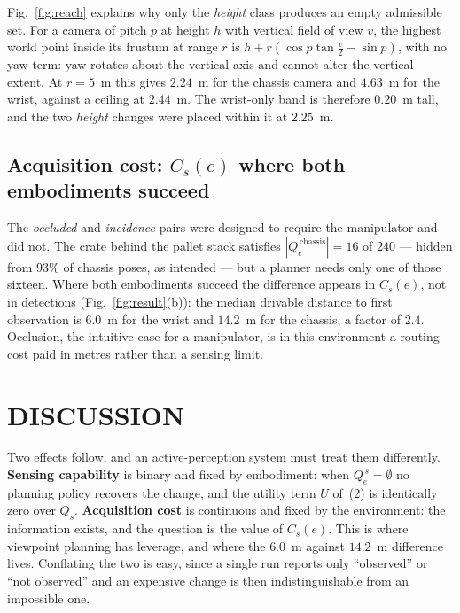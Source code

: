 \documentclass[letterpaper, 10 pt, conference]{ieeeconf}
\begin{document}
Fig.~\ref{fig:reach} explains why only the \emph{height} class produces an
empty admissible set. For a camera of pitch $p$ at height $h$ with vertical
field of view $v$, the highest world point inside its frustum at range $r$ is
$h + r\left(\cos p \tan \tfrac{v}{2} - \sin p\right)$, with no yaw term: yaw
rotates about the vertical axis and cannot alter the vertical extent. At
$r = 5$~m this gives $2.24$~m for the chassis camera and $4.63$~m for the
wrist, against a ceiling at $2.44$~m. The wrist-only band is therefore
$0.20$~m tall, and the two \emph{height} changes were placed within it at
$2.25$~m.

\subsection{Acquisition cost: $C_s(e)$ where both embodiments succeed}

The \emph{occluded} and \emph{incidence} pairs were designed to require the
manipulator and did not. The crate behind the pallet stack satisfies
$|Q_e^{\,\mathrm{chassis}}| = 16$ of $240$ --- hidden from $93\%$ of chassis
poses, as intended --- but a planner needs only one of those sixteen. Where
both embodiments succeed the difference appears in $C_s(e)$, not in detections
(Fig.~\ref{fig:result}(b)): the median drivable distance to first observation
is $6.0$~m for the wrist and $14.2$~m for the chassis, a factor of $2.4$.
Occlusion, the intuitive case for a manipulator, is in this environment a
routing cost paid in metres rather than a sensing limit.

\section{DISCUSSION}

Two effects follow, and an active-perception system must treat them
differently. \textbf{Sensing capability} is binary and fixed by embodiment:
when $Q_e^{\,s} = \emptyset$ no planning policy recovers the change, and the
utility term $U$ of~(2) is identically zero over $Q_s$. \textbf{Acquisition
cost} is continuous and fixed by the environment: the information exists, and
the question is the value of $C_s(e)$. This is where viewpoint planning has
leverage, and where the $6.0$~m against $14.2$~m difference lives. Conflating
the two is easy, since a single run reports only ``observed'' or ``not
observed'' and an expensive change is then indistinguishable from an impossible
one.
\end{document}
